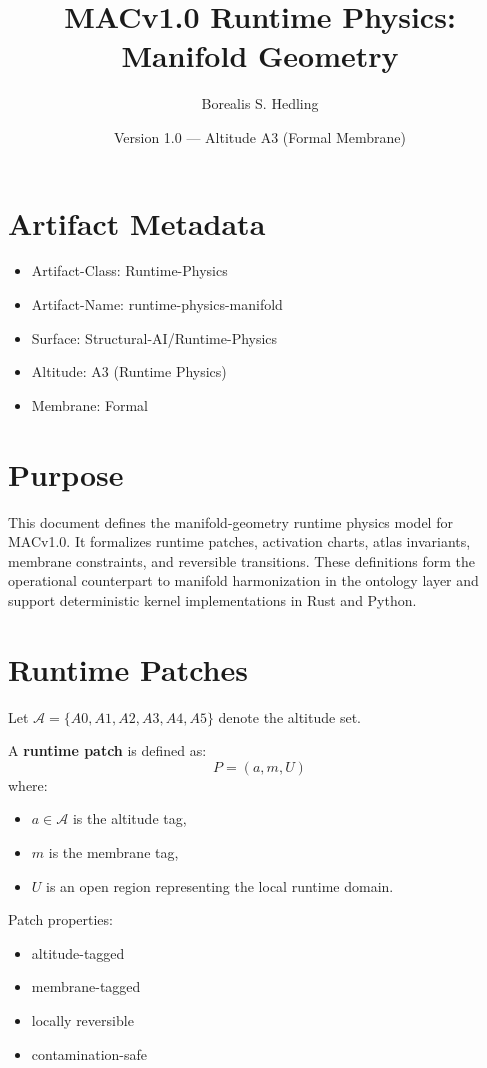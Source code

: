 \documentclass[12pt]{article}
\title{MACv1.0 Runtime Physics: Manifold Geometry}
\author{Borealis S. Hedling}
\date{Version 1.0 — Altitude A3 (Formal Membrane)}
\begin{document}
\maketitle

\section*{Artifact Metadata}
\begin{itemize}
  \item Artifact-Class: Runtime-Physics
  \item Artifact-Name: runtime-physics-manifold
  \item Surface: Structural-AI/Runtime-Physics
  \item Altitude: A3 (Runtime Physics)
  \item Membrane: Formal
\end{itemize}

\section{Purpose}
This document defines the manifold-geometry runtime physics model for MACv1.0.
It formalizes runtime patches, activation charts, atlas invariants, membrane
constraints, and reversible transitions. These definitions form the operational
counterpart to manifold harmonization in the ontology layer and support
deterministic kernel implementations in Rust and Python.

\section{Runtime Patches}

Let $\mathcal{A} = \{A0, A1, A2, A3, A4, A5\}$ denote the altitude set.

A \textbf{runtime patch} is defined as:
\[
P = (a, m, U)
\]
where:
\begin{itemize}
  \item $a \in \mathcal{A}$ is the altitude tag,
  \item $m$ is the membrane tag,
  \item $U$ is an open region representing the local runtime domain.
\end{itemize}

Patch properties:
\begin{itemize}
  \item altitude-tagged
  \item membrane-tagged
  \item locally reversible
  \item contamination-safe
\end{itemize}
\end{document}
